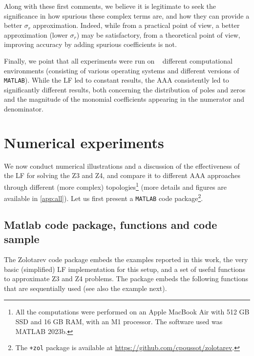 Along with these first comments, we believe it is legitimate to seek the significance in how spurious these complex terms are, and how they can provide a better $\sigma_r$ approximation. Indeed, while from a practical point of view, a better approximation (lower $\sigma_r$) may be satisfactory, from a theoretical point of view, improving accuracy by adding spurious coefficients is not.

Finally, we point that all experiments were run on \NARCH~ different computational environments (consisting of various operating systems and different versions of \texttt{MATLAB}). While the LF led to constant results, the AAA consistently led to significantly different results, both concerning the distribution of poles and zeros and the magnitude of the monomial coefficients appearing in the numerator and denominator. %


\section{Numerical experiments}\label{sec:num}

We now conduct numerical illustrations and a discussion of the effectiveness of the LF for solving the Z3 and Z4, and compare it to different AAA approaches through different (more complex) topologies\footnote{All the computations were performed on an Apple MacBook Air with 512 GB SSD and 16 GB RAM, with an M1 processor. The software used was MATLAB 2023b.} (more details and figures are available in \cref{app:all}). Let us first present a \texttt{MATLAB} code package\footnote{The \texttt{+zol} package is available at \url{https://github.com/cpoussot/zolotarev}.}. %

\subsection{Matlab code package, functions and code sample}

The Zolotarev code package embeds the examples reported in this work, the very basic (simplified) LF implementation for this setup, and a set of useful functions to approximate Z3 and Z4 problems. The package embeds the following functions that are sequentially used (see also the example next).

